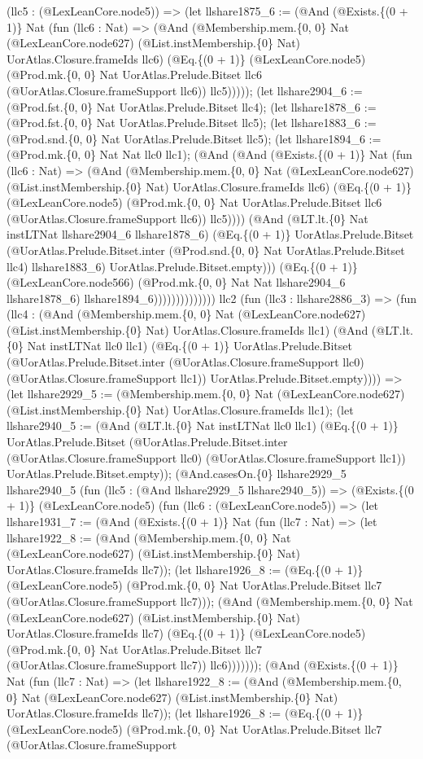 \documentclass[11pt]{article}
\begin{document}
(llc5 : (@LexLeanCore.node5)) => (let llshare1875\_6 := (@And (@Exists.\{(0 + 1)\} Nat (fun (llc6 : Nat) => (@And (@Membership.mem.\{0, 0\} Nat (@LexLeanCore.node627) (@List.instMembership.\{0\} Nat) UorAtlas.Closure.frameIds llc6) (@Eq.\{(0 + 1)\} (@LexLeanCore.node5) (@Prod.mk.\{0, 0\} Nat UorAtlas.Prelude.Bitset llc6 (@UorAtlas.Closure.frameSupport llc6)) llc5))))); (let llshare2904\_6 := (@Prod.fst.\{0, 0\} Nat UorAtlas.Prelude.Bitset llc4); (let llshare1878\_6 := (@Prod.fst.\{0, 0\} Nat UorAtlas.Prelude.Bitset llc5); (let llshare1883\_6 := (@Prod.snd.\{0, 0\} Nat UorAtlas.Prelude.Bitset llc5); (let llshare1894\_6 := (@Prod.mk.\{0, 0\} Nat Nat llc0 llc1); (@And (@And (@Exists.\{(0 + 1)\} Nat (fun (llc6 : Nat) => (@And (@Membership.mem.\{0, 0\} Nat (@LexLeanCore.node627) (@List.instMembership.\{0\} Nat) UorAtlas.Closure.frameIds llc6) (@Eq.\{(0 + 1)\} (@LexLeanCore.node5) (@Prod.mk.\{0, 0\} Nat UorAtlas.Prelude.Bitset llc6 (@UorAtlas.Closure.frameSupport llc6)) llc5)))) (@And (@LT.lt.\{0\} Nat instLTNat llshare2904\_6 llshare1878\_6) (@Eq.\{(0 + 1)\} UorAtlas.Prelude.Bitset (@UorAtlas.Prelude.Bitset.inter (@Prod.snd.\{0, 0\} Nat UorAtlas.Prelude.Bitset llc4) llshare1883\_6) UorAtlas.Prelude.Bitset.empty))) (@Eq.\{(0 + 1)\} (@LexLeanCore.node566) (@Prod.mk.\{0, 0\} Nat Nat llshare2904\_6 llshare1878\_6) llshare1894\_6)))))))))))))) llc2 (fun (llc3 : llshare2886\_3) => (fun (llc4 : (@And (@Membership.mem.\{0, 0\} Nat (@LexLeanCore.node627) (@List.instMembership.\{0\} Nat) UorAtlas.Closure.frameIds llc1) (@And (@LT.lt.\{0\} Nat instLTNat llc0 llc1) (@Eq.\{(0 + 1)\} UorAtlas.Prelude.Bitset (@UorAtlas.Prelude.Bitset.inter (@UorAtlas.Closure.frameSupport llc0) (@UorAtlas.Closure.frameSupport llc1)) UorAtlas.Prelude.Bitset.empty)))) => (let llshare2929\_5 := (@Membership.mem.\{0, 0\} Nat (@LexLeanCore.node627) (@List.instMembership.\{0\} Nat) UorAtlas.Closure.frameIds llc1); (let llshare2940\_5 := (@And (@LT.lt.\{0\} Nat instLTNat llc0 llc1) (@Eq.\{(0 + 1)\} UorAtlas.Prelude.Bitset (@UorAtlas.Prelude.Bitset.inter (@UorAtlas.Closure.frameSupport llc0) (@UorAtlas.Closure.frameSupport llc1)) UorAtlas.Prelude.Bitset.empty)); (@And.casesOn.\{0\} llshare2929\_5 llshare2940\_5 (fun (llc5 : (@And llshare2929\_5 llshare2940\_5)) => (@Exists.\{(0 + 1)\} (@LexLeanCore.node5) (fun (llc6 : (@LexLeanCore.node5)) => (let llshare1931\_7 := (@And (@Exists.\{(0 + 1)\} Nat (fun (llc7 : Nat) => (let llshare1922\_8 := (@And (@Membership.mem.\{0, 0\} Nat (@LexLeanCore.node627) (@List.instMembership.\{0\} Nat) UorAtlas.Closure.frameIds llc7)); (let llshare1926\_8 := (@Eq.\{(0 + 1)\} (@LexLeanCore.node5) (@Prod.mk.\{0, 0\} Nat UorAtlas.Prelude.Bitset llc7 (@UorAtlas.Closure.frameSupport llc7))); (@And (@Membership.mem.\{0, 0\} Nat (@LexLeanCore.node627) (@List.instMembership.\{0\} Nat) UorAtlas.Closure.frameIds llc7) (@Eq.\{(0 + 1)\} (@LexLeanCore.node5) (@Prod.mk.\{0, 0\} Nat UorAtlas.Prelude.Bitset llc7 (@UorAtlas.Closure.frameSupport llc7)) llc6))))))); (@And (@Exists.\{(0 + 1)\} Nat (fun (llc7 : Nat) => (let llshare1922\_8 := (@And (@Membership.mem.\{0, 0\} Nat (@LexLeanCore.node627) (@List.instMembership.\{0\} Nat) UorAtlas.Closure.frameIds llc7)); (let llshare1926\_8 := (@Eq.\{(0 + 1)\} (@LexLeanCore.node5) (@Prod.mk.\{0, 0\} Nat UorAtlas.Prelude.Bitset llc7 (@UorAtlas.Closure.frameSupport 
\end{document}
